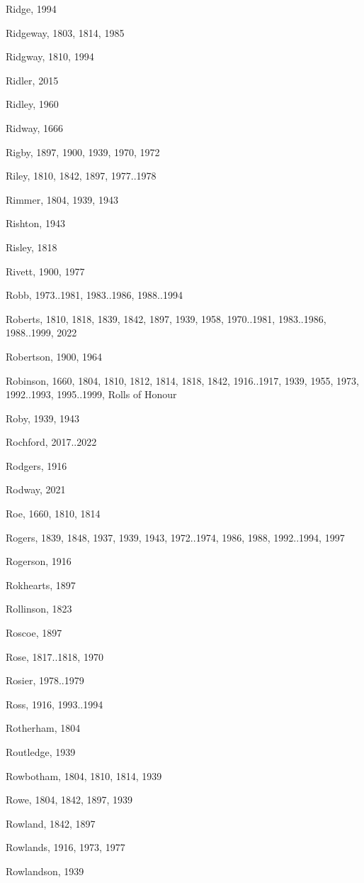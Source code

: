 \begin{theindex}
\item Ridge, 1994
\item Ridgeway, 1803, 1814, 1985
\item Ridgway, 1810, 1994
\item Ridler, 2015
\item Ridley, 1960
\item Ridway, 1666
\item Rigby, 1897, 1900, 1939, 1970, 1972
\item Riley, 1810, 1842, 1897, 1977..1978
\item Rimmer, 1804, 1939, 1943
\item Rishton, 1943
\item Risley, 1818
\item Rivett, 1900, 1977
\item Robb, 1973..1981, 1983..1986, 1988..1994
\item Roberts, 1810, 1818, 1839, 1842, 1897, 1939, 1958, 1970..1981, 1983..1986, 1988..1999, 2022
\item Robertson, 1900, 1964
\item Robinson, 1660, 1804, 1810, 1812, 1814, 1818, 1842, 1916..1917, 1939, 1955, 1973, 1992..1993, 1995..1999, Rolls of Honour
\item Roby, 1939, 1943
\item Rochford, 2017..2022
\item Rodgers, 1916
\item Rodway, 2021
\item Roe, 1660, 1810, 1814
\item Rogers, 1839, 1848, 1937, 1939, 1943, 1972..1974, 1986, 1988, 1992..1994, 1997
\item Rogerson, 1916
\item Rokhearts, 1897
\item Rollinson, 1823
\item Roscoe, 1897
\item Rose, 1817..1818, 1970
\item Rosier, 1978..1979
\item Ross, 1916, 1993..1994
\item Rotherham, 1804
\item Routledge, 1939
\item Rowbotham, 1804, 1810, 1814, 1939
\item Rowe, 1804, 1842, 1897, 1939
\item Rowland, 1842, 1897
\item Rowlands, 1916, 1973, 1977
\item Rowlandson, 1939

\end{theindex}
